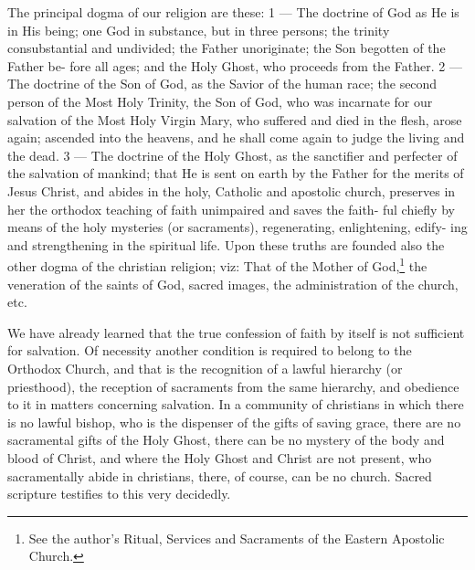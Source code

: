 The principal dogma of our religion are these: 
1 — The doctrine of God as He is in His being; 
one God in substance, but in three persons; the 
trinity consubstantial and undivided; the Father 
unoriginate; the Son begotten of the Father be- 
fore all ages; and the Holy Ghost, who proceeds 
from the Father. 2 — The doctrine of the Son 
of God, as the Savior of the human race; the 
second person of the Most Holy Trinity, the Son 
of God, who was incarnate for our salvation of 
the Most Holy Virgin Mary, who suffered and 
died in the flesh, arose again; ascended into the 
heavens, and he shall come again to judge the 
living and the dead. 3 — The doctrine of the 
Holy Ghost, as the sanctifier and perfecter of 
the salvation of mankind; that He is sent on 
earth by the Father for the merits of Jesus 
Christ, and abides in the holy, Catholic and 
apostolic church, preserves in her the orthodox 
teaching of faith unimpaired and saves the faith- 
ful chiefly by means of the holy mysteries (or 
sacraments), regenerating, enlightening, edify- 
ing and strengthening in the spiritual life. 
Upon these truths are founded also the other 
dogma of the christian religion; viz: That of 
the Mother of God,\footnote{See the author's Ritual,
Services and Sacraments of the Eastern Apostolic
Church.} the veneration of the saints of God,
sacred images, the administration of the church, etc. 

We have already learned that the true confession
of faith by itself is not sufficient for 
salvation. Of necessity another condition is 
required to belong to the Orthodox Church, and 
that is the recognition of a lawful hierarchy 
(or priesthood), the reception of sacraments 
from the same hierarchy, and obedience to it in 
matters concerning salvation. In a community
of christians in which there is no lawful bishop,
who is the dispenser of the gifts of saving grace,
there are no sacramental gifts of the 
Holy Ghost, there can be no mystery of the body 
and blood of Christ, and where the Holy Ghost 
and Christ are not present, who sacramentally 
abide in christians, there, of course, can be no 
church. Sacred scripture testifies to this very 
decidedly. 

